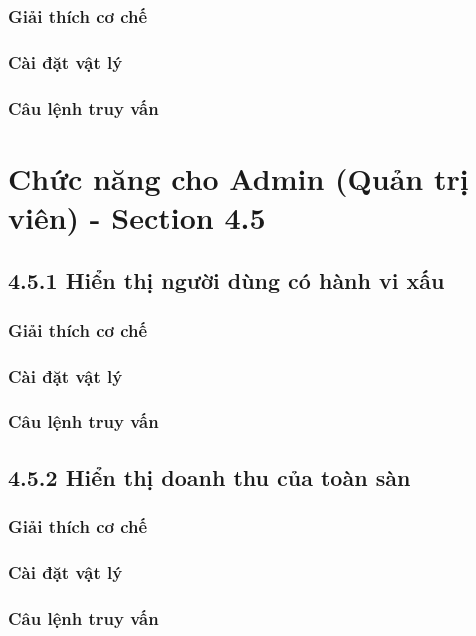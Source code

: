 \subsubsection{Giải thích cơ chế}

\subsubsection{Cài đặt vật lý}

\subsubsection{Câu lệnh truy vấn}

\section{Chức năng cho Admin (Quản trị viên) - Section 4.5}

\subsection{4.5.1 Hiển thị người dùng có hành vi xấu}

\subsubsection{Giải thích cơ chế}

\subsubsection{Cài đặt vật lý}

\subsubsection{Câu lệnh truy vấn}

\subsection{4.5.2 Hiển thị doanh thu của toàn sàn}

\subsubsection{Giải thích cơ chế}

\subsubsection{Cài đặt vật lý}

\subsubsection{Câu lệnh truy vấn}
